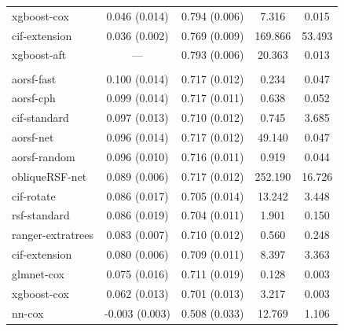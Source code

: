 \documentclass{article}\usepackage[]{graphicx}\usepackage[]{xcolor}
\newenvironment{knitrout}{}{} %
\begin{document}
\begin{knitrout}
\begin{longtable}[t]{lcccc}
\hspace{1em}xgboost-cox & 0.046 (0.014) & 0.794 (0.006) & 7.316 & 0.015\\
\hspace{1em}cif-extension & 0.036 (0.002) & 0.769 (0.009) & 169.866 & 53.493\\
\hspace{1em}xgboost-aft & --- & 0.793 (0.006) & 20.363 & 0.013\\
\addlinespace[0.3em]
\multicolumn{5}{l}{\textit{\textbf{Colon cancer; death, n = 929, p = 12}}}\\
\hline
\hspace{1em}aorsf-fast & 0.100 (0.014) & 0.717 (0.012) & 0.234 & 0.047\\
\hspace{1em}aorsf-cph & 0.099 (0.014) & 0.717 (0.011) & 0.638 & 0.052\\
\hspace{1em}cif-standard & 0.097 (0.013) & 0.710 (0.012) & 0.745 & 3.685\\
\hspace{1em}aorsf-net & 0.096 (0.014) & 0.717 (0.012) & 49.140 & 0.047\\
\hspace{1em}aorsf-random & 0.096 (0.010) & 0.716 (0.011) & 0.919 & 0.044\\
\hspace{1em}obliqueRSF-net & 0.089 (0.006) & 0.717 (0.012) & 252.190 & 16.726\\
\hspace{1em}cif-rotate & 0.086 (0.017) & 0.705 (0.014) & 13.242 & 3.448\\
\hspace{1em}rsf-standard & 0.086 (0.019) & 0.704 (0.011) & 1.901 & 0.150\\
\hspace{1em}ranger-extratrees & 0.083 (0.007) & 0.710 (0.012) & 0.560 & 0.248\\
\hspace{1em}cif-extension & 0.080 (0.006) & 0.709 (0.011) & 8.397 & 3.363\\
\hspace{1em}glmnet-cox & 0.075 (0.016) & 0.711 (0.019) & 0.128 & 0.003\\
\hspace{1em}xgboost-cox & 0.062 (0.013) & 0.701 (0.013) & 3.217 & 0.003\\
\hspace{1em}nn-cox & -0.003 (0.003) & 0.508 (0.033) & 12.769 & 1.106\\

\end{longtable}
\end{knitrout}
\end{document}
